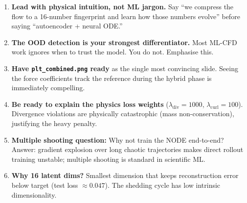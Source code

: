 \documentclass[11pt, a4paper]{article}
\begin{document}
\begin{enumerate}
  \item \textbf{Lead with physical intuition, not ML jargon.} Say ``we compress the flow
        to a 16-number fingerprint and learn how those numbers evolve'' before saying
        ``autoencoder + neural ODE.''

  \item \textbf{The OOD detection is your strongest differentiator.} Most ML-CFD work
        ignores when to trust the model. You do not. Emphasise this.

  \item \textbf{Have \texttt{plt\_combined.png} ready} as the single most convincing slide.
        Seeing the force coefficients track the reference during the hybrid phase is immediately
        compelling.

  \item \textbf{Be ready to explain the physics loss weights}
        ($\lambda_\text{div}=1000$, $\lambda_\text{curl}=100$). Divergence violations are
        physically catastrophic (mass non-conservation), justifying the heavy penalty.

  \item \textbf{Multiple shooting question:} Why not train the NODE end-to-end?
        Answer: gradient explosion over long chaotic trajectories makes direct rollout
        training unstable; multiple shooting is standard in scientific ML.

  \item \textbf{Why 16 latent dims?} Smallest dimension that keeps reconstruction error
        below target (test loss $\approx 0.047$). The shedding cycle has low intrinsic
        dimensionality.
\end{enumerate}
\end{document}
